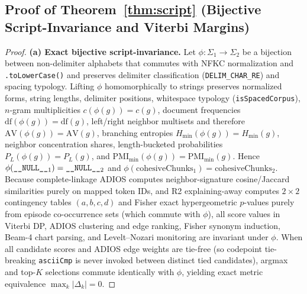 \subsection{Proof of Theorem~\ref{thm:script} (Bijective Script-Invariance and Viterbi Margins)}
\label{app:proof5}

\begin{proof}
\textbf{(a) Exact bijective script-invariance.}
Let $\phi: \Sigma_1 \to \Sigma_2$ be a bijection between non-delimiter alphabets that commutes with NFKC normalization and \texttt{.toLowerCase()} and preserves delimiter classification (\texttt{DELIM\_\allowbreak CHAR\_\allowbreak RE}) and spacing typology. Lifting $\phi$ homomorphically to strings preserves normalized forms, string lengths, delimiter positions, whitespace typology (\texttt{isSpaced\allowbreak Corpus}), $n$-gram multiplicities $c(\phi(g)) = c(g)$, document frequencies $\mathrm{df}(\phi(g)) = \mathrm{df}(g)$, left/right neighbor multisets and therefore $\mathrm{AV}(\phi(g)) = \mathrm{AV}(g)$, branching entropies $H_{\min}(\phi(g)) = H_{\min}(g)$, neighbor concentration shares, length-bucketed probabilities $P_L(\phi(g)) = P_L(g)$, and $\mathrm{PMI}_{\min}(\phi(g)) = \mathrm{PMI}_{\min}(g)$. Hence $\phi(\texttt{\_\_NULL\_\_}{}_1) = \texttt{\_\_NULL\_\_}{}_2$ and $\phi(\text{cohesiveChunks}_1) = \text{cohesiveChunks}_2$.
Because complete-linkage ADIOS computes neighbor-signature cosine/Jaccard similarities purely on mapped token IDs, and R2 explaining-away computes $2 \times 2$ contingency tables $(a, b, c, d)$ and Fisher exact hypergeometric $p$-values purely from episode co-occurrence sets (which commute with $\phi$), all score values in Viterbi DP, ADIOS clustering and edge ranking, Fisher synonym induction, Beam-4 chart parsing, and Levelt--Nozari monitoring are invariant under $\phi$. When all candidate scores and ADIOS edge weights are tie-free (so codepoint tie-breaking \texttt{asciiCmp} is never invoked between distinct tied candidates), argmax and top-$K$ selections commute identically with $\phi$, yielding exact metric equivalence $\max_k |\Delta_k| = 0$.


\end{proof}

